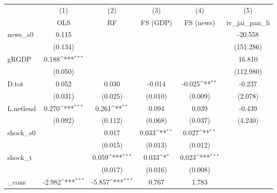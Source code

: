 {
\def\sym#1{\ifmmode^{#1}\else\(^{#1}\)\fi}
\begin{tabular}{l*{5}{c}}
\toprule
            &\multicolumn{1}{c}{(1)}&\multicolumn{1}{c}{(2)}&\multicolumn{1}{c}{(3)}&\multicolumn{1}{c}{(4)}&\multicolumn{1}{c}{(5)}\\
            &\multicolumn{1}{c}{OLS}&\multicolumn{1}{c}{RF}&\multicolumn{1}{c}{FS (GDP)}&\multicolumn{1}{c}{FS (news)}&\multicolumn{1}{c}{iv\_jai\_pan\_li}\\
\midrule
news\_s0     &       0.115         &                     &                     &                     &     -20.558         \\
            &     (0.134)         &                     &                     &                     &   (151.286)         \\
\addlinespace
gRGDP       &       0.188\sym{***}&                     &                     &                     &      16.810         \\
            &     (0.050)         &                     &                     &                     &   (112.980)         \\
\addlinespace
D.tot       &       0.052         &       0.030         &      -0.014         &      -0.025\sym{**} &      -0.237         \\
            &     (0.031)         &     (0.025)         &     (0.010)         &     (0.009)         &     (2.078)         \\
\addlinespace
L.netlend   &       0.270\sym{***}&       0.261\sym{**} &       0.094         &       0.039         &      -0.439         \\
            &     (0.092)         &     (0.112)         &     (0.068)         &     (0.037)         &     (4.240)         \\
\addlinespace
shock\_s0    &                     &       0.017         &       0.033\sym{**} &       0.027\sym{**} &                     \\
            &                     &     (0.015)         &     (0.013)         &     (0.012)         &                     \\
\addlinespace
shock\_t     &                     &       0.059\sym{***}&       0.033\sym{*}  &       0.023\sym{***}&                     \\
            &                     &     (0.017)         &     (0.016)         &     (0.008)         &                     \\
\addlinespace
\_cons      &      -2.982\sym{***}&      -5.857\sym{***}&       0.767         &       1.783         &                     \\

\end{tabular}}
